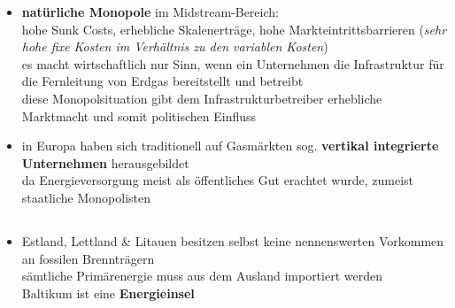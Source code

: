 \documentclass[11pt,a4paper]{article}
\begin{document}
\begin{itemize}
\item \textbf{natürliche Monopole} im Midstream-Bereich:\\
 hohe Sunk Costs, erhebliche Skalenerträge, hohe Markteintrittsbarrieren (\textsl{sehr hohe fixe Kosten im Verhältnis zu den variablen Kosten})\\
 es macht wirtschaftlich nur Sinn, wenn ein Unternehmen die Infrastruktur für die Fernleitung von Erdgas bereitstellt und betreibt\\
 diese Monopolsituation gibt dem Infrastrukturbetreiber erhebliche Marktmacht und somit politischen Einfluss


\item in Europa haben sich traditionell auf Gasmärkten sog. \textbf{vertikal integrierte Unternehmen} herausgebildet\\
 da Energieversorgung meist als öffentliches Gut erachtet wurde, zumeist staatliche Monopolisten


\end{itemize}




\subsection*{}

\begin{itemize}

\item Estland, Lettland \& Litauen besitzen selbst keine nennenswerten Vorkommen an fossilen Brennträgern\\
 sämtliche Primärenergie muss aus dem Ausland importiert werden\\
 Baltikum ist eine \textbf{Energieinsel}


\end{itemize}


\paragraph{} 
\end{document}
